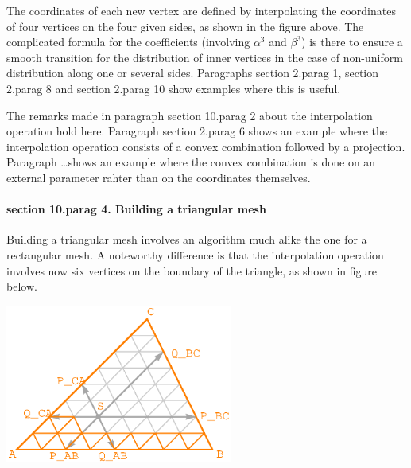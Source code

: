 The coordinates of each new vertex are defined by interpolating the coordinates of four vertices
on the four given sides, as shown in the figure above.
The complicated formula for the coefficients (involving $ \alpha^3 $ and $ \beta^3 $) is there
to ensure a smooth transition for the distribution of inner vertices in the case of non-uniform
distribution along one or several sides.
Paragraphs \numb section 2.\numb parag 1, \numb section 2.\numb parag 8 and
\numb section 2.\numb parag 10 show examples where this is useful.

The remarks made in paragraph \numb section 10.\numb parag 2 about the interpolation operation
hold here.
Paragraph \numb section 2.\numb parag 6 shows an example where the interpolation operation
consists of a convex combination followed by a projection.
Paragraph \dots shows an example where the convex combination is done on an external parameter
rahter than on the coordinates themselves.


\paragraph{\numb section 10.\numb parag 4. Building a triangular mesh}

Building a triangular mesh involves an algorithm much alike the one for a rectangular mesh.
A noteworthy difference is that the interpolation operation involves now six vertices on
the boundary of the triangle, as shown in figure below.

{ 
\centerline{\includegraphics[width=75mm]{fig-triangle.eps}} }

